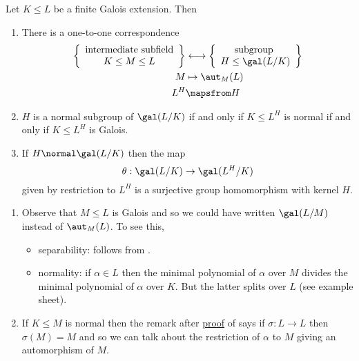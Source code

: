 \documentclass[a4paper]{article}
\begin{document}
\begin{theorem}
  \label{thm:fundamental}
  Let \(K \leq L\) be a finite Galois extension. Then
  \begin{enumerate}
  \item There is a one-to-one correspondence
    \begin{align*}
      \left\{
        \begin{array}[h]{c}
          \text{intermediate subfield} \\
          K \leq M \leq L
        \end{array}
      \right\}
      &\longleftrightarrow
      \left\{
        \begin{array}[h]{c}
          \text{subgroup } \\
          H \leq \gal(L/K)
        \end{array}
      \right\} \\
      M &\mapsto \aut_M(L) \\
      L^H &\mapsfrom H
    \end{align*}
  \item \(H\) is a normal subgroup of \(\gal(L/K)\) if and only if \(K \leq L^H\) is normal if and only if \(K \leq L^H\) is Galois.
  \item If \(H \normal \gal(L/K)\) then the map
    \[
      \theta: \gal(L/K) \to \gal(L^H/K)
    \]
    given by restriction to \(L^H\) is a surjective group homomorphism with kernel \(H\).
  \end{enumerate}
\end{theorem}

\begin{remark}\leavevmode
  \begin{enumerate}
  \item Observe that \(M \leq L\) is Galois and so we could have written \(\gal(L/M)\) instead of \(\aut_M(L)\). To see this,
    \begin{itemize}
    \item separability: follows from .
    \item normality: if \(\alpha \in L\) then the minimal polynomial of \(\alpha\) over \(M\) divides the minimal polynomial of \(\alpha\) over \(K\). But the latter splits over \(L\) (see example sheet).
    \end{itemize}
  \item If \(K \leq M\) is normal then the remark after \hyperref[proof:galois criterion]{proof} of  says if \(\sigma: L \to L\) then \(\sigma(M) = M\) and so we can talk about the restriction of \(\alpha\) to \(M\) giving an automorphism of \(M\).
  \end{enumerate}
\end{remark}
\end{document}
